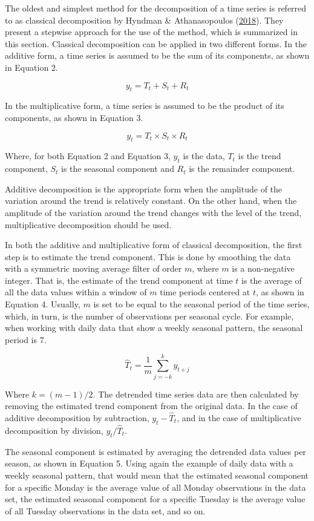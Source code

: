 \documentclass[12pt,oneside]{reedthesis}
\begin{document}
The oldest and simplest method for the decomposition of a time series is
referred to as classical decomposition by Hyndman \& Athanasopoulos
(\protect\hyperlink{ref-hyndman2018fpp}{2018}). They present a stepwise
approach for the use of the method, which is summarized in this section.
Classical decomposition can be applied in two different forms. In the
additive form, a time series is assumed to be the sum of its components,
as shown in Equation 2.

\[ y_{t} = T_{t} + S_{t} + R_{t} \]

In the multiplicative form, a time series is assumed to be the product
of its components, as shown in Equation 3.

\[ y_{t} = T_{t} \times S_{t} \times R_{t} \]

Where, for both Equation 2 and Equation 3, \(y_{t}\) is the data,
\(T_{t}\) is the trend component, \(S_{t}\) is the seasonal component
and \(R_{t}\) is the remainder component.

Additive decomposition is the appropriate form when the amplitude of the
variation around the trend is relatively constant. On the other hand,
when the amplitude of the variation around the trend changes with the
level of the trend, multiplicative decomposition should be used.

In both the additive and multiplicative form of classical decomposition,
the first step is to estimate the trend component. This is done by
smoothing the data with a symmetric moving average filter of order
\(m\), where \(m\) is a non-negative integer. That is, the estimate of
the trend component at time \(t\) is the average of all the data values
within a window of \(m\) time periods centered at \(t\), as shown in
Equation 4. Usually, \(m\) is set to be equal to the seasonal period of
the time series, which, in turn, is the number of observations per
seasonal cycle. For example, when working with daily data that show a
weekly seasonal pattern, the seasonal period is 7.

\[ \hat{T}_{t} = \frac{1}{m}\sum_{j=-k}^{k}y_{t+j} \]

Where \(k = (m-1)/2\). The detrended time series data are then
calculated by removing the estimated trend component from the original
data. In the case of additive decomposition by subtraction,
\(y_{t} - \hat{T}_{t}\), and in the case of multiplicative decomposition
by division, \(y_{t}/\hat{T}_{t}\).

The seasonal component is estimated by averaging the detrended data
values per season, as shown in Equation 5. Using again the example of
daily data with a weekly seasonal pattern, that would mean that the
estimated seasonal component for a specific Monday is the average value
of all Monday observations in the data set, the estimated seasonal
component for a specific Tuesday is the average value of all Tuesday
observations in the data set, and so on.
\end{document}
